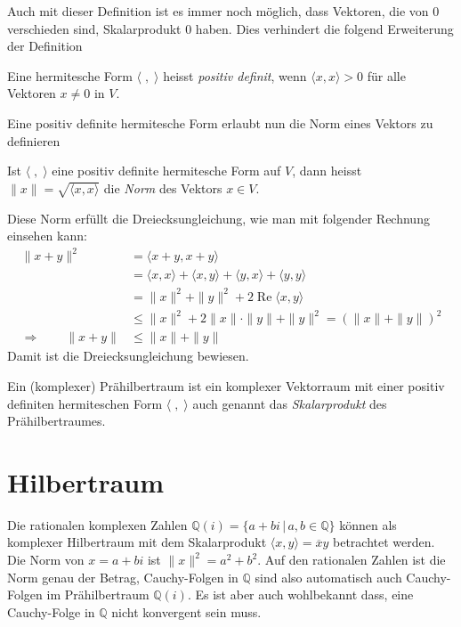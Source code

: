 Auch mit dieser Definition ist es immer noch möglich, dass Vektoren,
die von $0$ verschieden sind, Skalarprodukt $0$ haben.
Dies verhindert die folgend Erweiterung der Definition

\begin{definition}
\label{hilbert:postivdefiniteform}
Eine hermitesche Form $\langle\;,\;\rangle$ heisst {\em positiv definit},
wenn $\langle x,x\rangle > 0$ für alle Vektoren $x\ne 0$ in $V$.
\end{definition}

Eine positiv definite hermitesche Form erlaubt nun die Norm
eines Vektors zu definieren

\begin{definition}
Ist $\langle \;,\;\rangle$ eine positiv definite hermitesche Form
auf $V$, dann heisst $\|x\| = \sqrt{\langle x,x\rangle}$ die {\em Norm}
des Vektors $x\in V$.
\end{definition}

Diese Norm erfüllt die Dreiecksungleichung, wie man mit folgender
Rechnung einsehen kann:
\begin{align*}
\|x+y\|^2
&=
\langle x+y,x+y\rangle
\\
&=
\langle x,x\rangle
+
\langle x,y\rangle
+
\langle y,x\rangle
+
\langle y,y\rangle
\\
&=
\|x\|^2 + \|y\|^2
+ 2\operatorname{Re}\langle x,y\rangle
\\
&\le
\|x\|^2 + 2\|x\|\cdot \|y\| + \|y\|^2 = (\|x\| + \|y\|)^2
\\
\Rightarrow\qquad
\|x+y\|
&\le
\|x\| + \|y\|
\end{align*}
Damit ist die Dreiecksungleichung bewiesen.

\begin{definition}
Ein (komplexer) Prähilbertraum ist ein komplexer Vektorraum mit
einer positiv definiten hermiteschen Form $\langle\;,\;\rangle$
auch genannt das {\em Skalarprodukt} des Prähilbertraumes.
\end{definition}

\section{Hilbertraum}
Die rationalen komplexen Zahlen $\mathbb Q(i)=\{a+bi\,|\,a,b\in\mathbb Q\}$
können als komplexer Hilbertraum mit dem Skalarprodukt
$\langle x,y\rangle = \overline{x}y$ betrachtet werden.
Die Norm von $x=a+bi$ ist $\|x\|^2=a^2+b^2$.
Auf den rationalen Zahlen ist die Norm genau der Betrag, Cauchy-Folgen
in $\mathbb Q$ sind also automatisch auch Cauchy-Folgen im
Prähilbertraum $\mathbb Q(i)$.
Es ist aber auch wohlbekannt dass, eine Cauchy-Folge in $\mathbb Q$
nicht konvergent sein muss.

